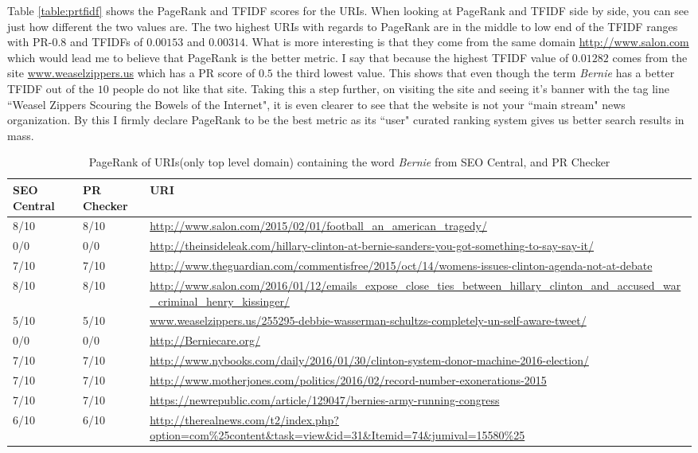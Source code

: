 \documentclass[letterpaper,10pt]{article}
\begin{document}
Table \ref{table:prtfidf} shows the PageRank and TFIDF scores for the URIs. When looking at PageRank and TFIDF side by side, you can see just how different the two values are. The two highest URIs with regards to PageRank are in the middle to low end of the TFIDF ranges with PR-$0.8$ and TFIDFs of $0.00153$ and $0.00314$. What is more interesting is that they come from the same domain \url{http://www.salon.com} which would lead me to believe that PageRank is the better metric.  
\newline
\newline
I say that because the highest TFIDF value of $0.01282$ comes from the site \url{www.weaselzippers.us} which has a PR score of $0.5$ the third lowest value. This shows that even though the term \emph{Bernie} has a better TFIDF out of the $10$ people do not like that site. Taking this a step further, on visiting the site and seeing it's banner with the tag line ``Weasel Zippers Scouring the Bowels of the Internet", it is even clearer to see that the website is not your ``main stream" news organization. By this I firmly declare PageRank to be the best metric as its ``user" curated ranking system gives us better search results in mass.

\begin{table}
\begin{tabular}{| p{1.5cm} | p{1.5cm} | p{8.0cm} | }
\hline
\textbf{SEO Central} & \textbf{PR Checker} & \textbf{URI} \\
\hline
8/10 & 8/10 & \url{http://www.salon.com/2015/02/01/football_an_american_tragedy/} \\
\hline
0/0 & 0/0 & \url{http://theinsideleak.com/hillary-clinton-at-bernie-sanders-you-got-something-to-say-say-it/} \\
\hline 
7/10 & 7/10 & \url{http://www.theguardian.com/commentisfree/2015/oct/14/womens-issues-clinton-agenda-not-at-debate} \\
\hline
8/10 & 8/10  & \url{http://www.salon.com/2016/01/12/emails_expose_close_ties_between_hillary_clinton_and_accused_war_criminal_henry_kissinger/} \\
\hline
5/10 & 5/10 &  \url{www.weaselzippers.us/255295-debbie-wasserman-schultzs-completely-un-self-aware-tweet/} \\
\hline
0/0 & 0/0 & \url{http://Berniecare.org/} \\
\hline
7/10 & 7/10 & \url{http://www.nybooks.com/daily/2016/01/30/clinton-system-donor-machine-2016-election/} \\
\hline
7/10 & 7/10 & \url{http://www.motherjones.com/politics/2016/02/record-number-exonerations-2015} \\
\hline
7/10 & 7/10 & \url{https://newrepublic.com/article/129047/bernies-army-running-congress} \\
\hline
6/10& 6/10  & \url{http://therealnews.com/t2/index.php?option=com%25content&task=view&id=31&Itemid=74&jumival=15580%25} \\
\hline
\end{tabular}
\caption{PageRank of URIs(only top level domain) containing the word \emph{Bernie} from  SEO Central, and PR Checker}
\label{table:prtoplvl}
\end{table}
\end{document}
